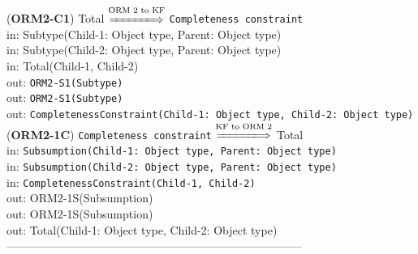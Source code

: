 \documentclass[sn-mathphys]{sn-jnl}
\begin{document}
{{{{({\bf ORM2-C1}) {Total} $\overset{\text{ORM 2 to KF}}{\xLongrightarrow{\hspace*{1.4cm}}}$ {\tt Completeness constraint}\\
\hspace*{0.3cm}in: {Subtype(Child-1: Object type, Parent: Object type)} \\
\hspace*{0.3cm}in: {Subtype(Child-2: Object type, Parent: Object type)} \\
\hspace*{0.3cm}in: {Total(Child-1, Child-2)} \\
\hspace*{0.5cm}out:  {\tt ORM2-S1(Subtype)}\\
\hspace*{0.5cm}out:  {\tt ORM2-S1(Subtype)}\\
\hspace*{0.5cm}out:  {\tt CompletenessConstraint(Child-1: Object type, Child-2: Object type)}\\

({\bf ORM2-1C}) {\tt Completeness constraint} $\overset{\text{KF to ORM 2}}{\xLongrightarrow{\hspace*{1.4cm}}}$ {Total}\\
\hspace*{0.3cm}in: {\tt Subsumption(Child-1: Object type, Parent: Object type)} \\
\hspace*{0.3cm}in: {\tt Subsumption(Child-2: Object type, Parent: Object type)} \\
\hspace*{0.3cm}in: {\tt CompletenessConstraint(Child-1, Child-2)} \\
\hspace*{0.5cm}out:  {ORM2-1S(Subsumption)}\\
\hspace*{0.5cm}out:  {ORM2-1S(Subsumption)}\\
\hspace*{0.5cm}out:  {Total(Child-1: Object type, Child-2: Object type)}\\

------------------------------------------------------------------------------
\\ \

}}}}
\end{document}
